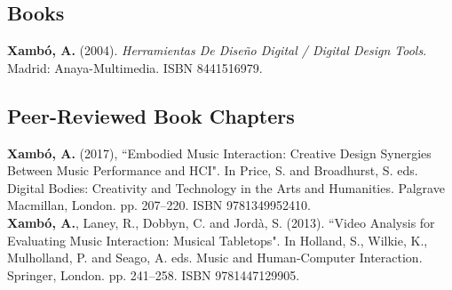 \documentclass[10pt, a4paper]{article}
\newcommand{\years}[1]{\marginnote{\scriptsize #1}}
\begin{document}
\subsection*{Books}
\noindent
\years{2004}\textbf{Xambó, A.} (2004). \emph{Herramientas De Diseño Digital / Digital Design Tools}. Madrid: Anaya-Multimedia. ISBN 8441516979.

\subsection*{Peer-Reviewed Book Chapters}
\noindent
\years{2016}\textbf{Xambó, A.} (2017), “Embodied Music Interaction: Creative Design Synergies Between Music Performance and HCI". In Price, S. and Broadhurst, S. eds. Digital Bodies: Creativity and Technology in the Arts and Humanities. Palgrave Macmillan, London. pp. 207--220. ISBN 9781349952410.\\
\years{2013}\textbf{Xambó, A.}, Laney, R., Dobbyn, C. and Jordà, S. (2013). “Video Analysis for Evaluating Music Interaction: Musical Tabletops". In Holland, S., Wilkie, K., Mulholland, P. and Seago, A. eds. Music and Human-Computer Interaction. Springer, London. pp. 241--258. ISBN 9781447129905.
\end{document}
